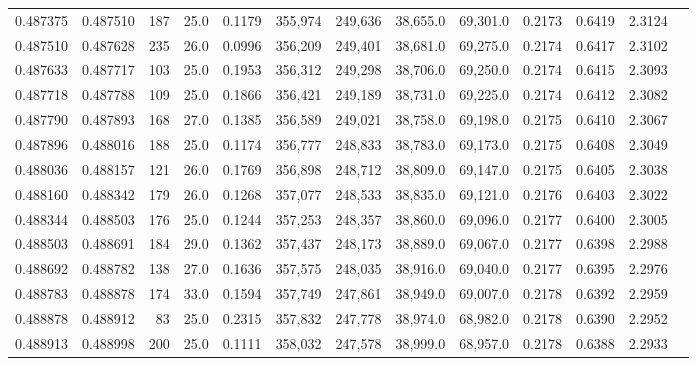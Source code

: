 \begin{tabular}{rrrrrrrrrrrrr}
0.487375 & 0.487510 &   187 & 25.0 &                                     0.1179 & 355,974 & 249,636 &  38,655.0 &  69,301.0 & 0.2173 & 0.6419 & 2.3124 \\
0.487510 & 0.487628 &   235 & 26.0 &                                     0.0996 & 356,209 & 249,401 &  38,681.0 &  69,275.0 & 0.2174 & 0.6417 & 2.3102 \\
0.487633 & 0.487717 &   103 & 25.0 &                                     0.1953 & 356,312 & 249,298 &  38,706.0 &  69,250.0 & 0.2174 & 0.6415 & 2.3093 \\
0.487718 & 0.487788 &   109 & 25.0 &                                     0.1866 & 356,421 & 249,189 &  38,731.0 &  69,225.0 & 0.2174 & 0.6412 & 2.3082 \\
0.487790 & 0.487893 &   168 & 27.0 &                                     0.1385 & 356,589 & 249,021 &  38,758.0 &  69,198.0 & 0.2175 & 0.6410 & 2.3067 \\
0.487896 & 0.488016 &   188 & 25.0 &                                     0.1174 & 356,777 & 248,833 &  38,783.0 &  69,173.0 & 0.2175 & 0.6408 & 2.3049 \\
0.488036 & 0.488157 &   121 & 26.0 &                                     0.1769 & 356,898 & 248,712 &  38,809.0 &  69,147.0 & 0.2175 & 0.6405 & 2.3038 \\
0.488160 & 0.488342 &   179 & 26.0 &                                     0.1268 & 357,077 & 248,533 &  38,835.0 &  69,121.0 & 0.2176 & 0.6403 & 2.3022 \\
0.488344 & 0.488503 &   176 & 25.0 &                                     0.1244 & 357,253 & 248,357 &  38,860.0 &  69,096.0 & 0.2177 & 0.6400 & 2.3005 \\
0.488503 & 0.488691 &   184 & 29.0 &                                     0.1362 & 357,437 & 248,173 &  38,889.0 &  69,067.0 & 0.2177 & 0.6398 & 2.2988 \\
0.488692 & 0.488782 &   138 & 27.0 &                                     0.1636 & 357,575 & 248,035 &  38,916.0 &  69,040.0 & 0.2177 & 0.6395 & 2.2976 \\
0.488783 & 0.488878 &   174 & 33.0 &                                     0.1594 & 357,749 & 247,861 &  38,949.0 &  69,007.0 & 0.2178 & 0.6392 & 2.2959 \\
0.488878 & 0.488912 &    83 & 25.0 &                                     0.2315 & 357,832 & 247,778 &  38,974.0 &  68,982.0 & 0.2178 & 0.6390 & 2.2952 \\
0.488913 & 0.488998 &   200 & 25.0 &                                     0.1111 & 358,032 & 247,578 &  38,999.0 &  68,957.0 & 0.2178 & 0.6388 & 2.2933 \\

\end{tabular}
